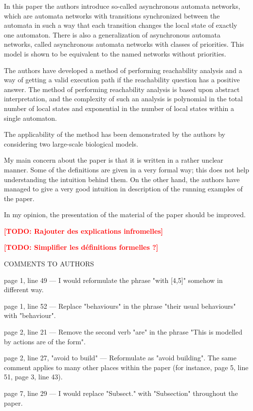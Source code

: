 \documentclass[11pt]{article}
\newcommand{\todo}[1]{\textcolor{red}{\textbf{[TODO: #1]}}}
\begin{document}
In this paper the authors introduce so-called asynchronous automata networks, which are automata networks with transitions synchronized between the automata in such a way that each transition changes the local state of exactly one automaton. There is also a generalization of asynchronous automata networks, called asynchronous automata networks with classes of priorities. This model is shown to be equivalent to the named networks without priorities.

The authors have developed a method of performing reachability analysis and a way of getting a valid execution path if the reachability question has a positive answer. The method of performing reachability analysis is based upon abstract interpretation, and the complexity of such an analysis is polynomial in the total number of local states and exponential in the number of local states within a single automaton.

The applicability of the method has been demonstrated by the authors by considering two large-scale biological models.

My main concern about the paper is that it is written in a rather unclear manner. Some of the definitions are given in a very formal way; this does not help understanding the intuition behind them. On the other hand, the authors have managed to give a very good intuition in description of the running examples of the paper.

In my opinion, the presentation of the material of the paper should be improved.

\todo{Rajouter des explications infromelles}

\todo{Simplifier les définitions formelles ?}

COMMENTS TO AUTHORS

page 1, line 49 ---
I would reformulate the phrase "with [4,5]" somehow in different way.

page 1, line 52 ---
Replace "behaviours" in the phrase "their usual behaviours" with "behaviour".

page 2, line 21 ---
Remove the second verb "are" in the phrase "This is modelled by actions are of the form".

page 2, line 27, "avoid to build" ---
Reformulate as "avoid building".
The same comment applies to many other places within the paper (for instance, page 5, line 51, page 3, line 43).

page 7, line 29 ---
I would replace "Subsect." with "Subsection" throughout the paper.
\end{document}

